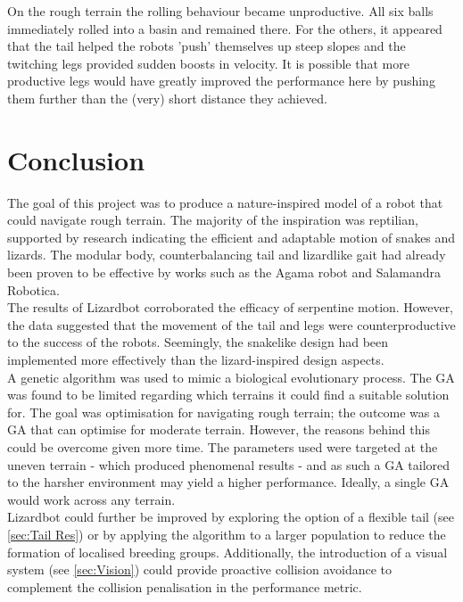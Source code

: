 \documentclass{article}
\begin{document}
On the rough terrain the rolling behaviour became unproductive. All six balls immediately rolled into a basin and remained there. For the others, it appeared that the tail helped the robots 'push' themselves up steep slopes and the twitching legs provided sudden boosts in velocity. It is possible that more productive legs would have greatly improved the performance here by pushing them further than the (very) short distance they achieved.

\newpage
\section{Conclusion}
\label{sec:Conclusion}

The goal of this project was to produce a nature-inspired model of a robot that could navigate rough terrain. The majority of the inspiration was reptilian, supported by research indicating the efficient and adaptable motion of snakes and lizards. The modular body, counterbalancing tail and lizardlike gait had already been proven to be effective by works such as the Agama robot and Salamandra Robotica. \\

The results of Lizardbot corroborated the efficacy of serpentine motion. However, the data suggested that the movement of the tail and legs were counterproductive to the success of the robots. Seemingly, the snakelike design had been implemented more effectively than the lizard-inspired design aspects.\\ 

A genetic algorithm was used to mimic a biological evolutionary process. The GA was found to be limited regarding which terrains it could find a suitable solution for. The goal was optimisation for navigating rough terrain; the outcome was a GA that can optimise for moderate terrain. However, the reasons behind this could be overcome given more time. The parameters used were targeted at the uneven terrain - which produced phenomenal results - and as such a GA tailored to the harsher environment may yield a higher performance. Ideally, a single GA would work across any terrain.\\
Lizardbot could further be improved by exploring the option of a flexible tail (see \ref{sec:Tail Res}) or by applying the algorithm to a larger population to reduce the formation of localised breeding groups. Additionally, the introduction of a visual system (see \ref{sec:Vision}) could provide proactive collision avoidance to complement the collision penalisation in the performance metric. \\
\end{document}
